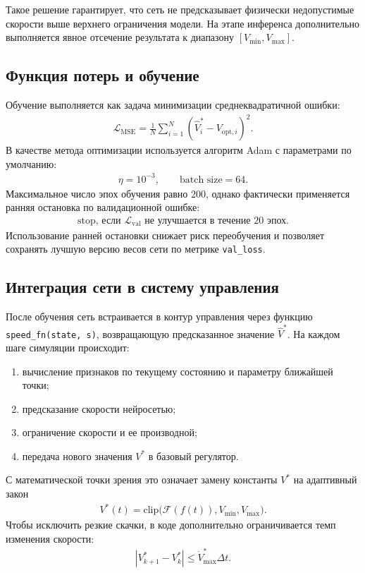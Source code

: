 Такое решение гарантирует, что сеть не предсказывает физически недопустимые скорости выше верхнего ограничения модели. На этапе инференса дополнительно выполняется явное отсечение результата к диапазону $[V_{\min},V_{\max}]$.

\subsection{Функция потерь и обучение}

Обучение выполняется как задача минимизации среднеквадратичной ошибки:
\begin{gather}
    \mathcal{L}_{\mathrm{MSE}} =
    \frac{1}{N}\sum_{i=1}^{N}\left(\hat{V}^{\ast}_i - V_{\mathrm{opt},i}\right)^2.
\end{gather}
В качестве метода оптимизации используется алгоритм Adam с параметрами по умолчанию:
\begin{gather}
    \eta = 10^{-3}, \qquad \text{batch size} = 64.
\end{gather}
Максимальное число эпох обучения равно $200$, однако фактически применяется ранняя остановка по валидационной ошибке:
\begin{gather}
    \text{stop, если } \mathcal{L}_{\mathrm{val}} \text{ не улучшается в течение } 20 \text{ эпох}.
\end{gather}
Использование ранней остановки снижает риск переобучения и позволяет сохранять лучшую версию весов сети по метрике \texttt{val\_loss}.

\subsection{Интеграция сети в систему управления}

После обучения сеть встраивается в контур управления через функцию \texttt{speed\_fn(state, s)}, возвращающую предсказанное значение $\hat{V}^{\ast}$. На каждом шаге симуляции происходит:
\begin{enumerate}
    \item вычисление признаков по текущему состоянию и параметру ближайшей точки;
    \item предсказание скорости нейросетью;
    \item ограничение скорости и ее производной;
    \item передача нового значения $V^{\ast}$ в базовый регулятор.
\end{enumerate}

С математической точки зрения это означает замену константы $V^{\ast}$ на адаптивный закон
\begin{gather}
    V^{\ast}(t) = \mathrm{clip}\bigl(\mathcal{F}(f(t)), V_{\min}, V_{\max}\bigr).
\end{gather}
Чтобы исключить резкие скачки, в коде дополнительно ограничивается темп изменения скорости:
\begin{gather}
    |V^{\ast}_{k+1} - V^{\ast}_{k}| \le \dot{V}^{\ast}_{\max} \Delta t.
\end{gather}

